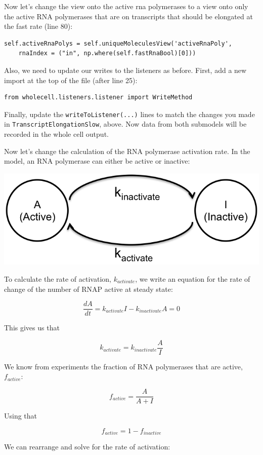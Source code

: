 \documentclass[12pt]{article}
\begin{document}
Now let's change the view onto the active rna polymerases to a view onto only the active RNA polymerases that are on transcripts that should be elongated at the fast rate (line 80):

\begin{lstlisting}
self.activeRnaPolys = self.uniqueMoleculesView('activeRnaPoly',
	rnaIndex = ("in", np.where(self.fastRnaBool)[0]))
\end{lstlisting}

Also, we need to update our writes to the listeners as before. First, add a new import at the top of the file (after line 25):
\begin{lstlisting}
from wholecell.listeners.listener import WriteMethod
\end{lstlisting}

Finally, update the \texttt{writeToListener(...)} lines to match the changes you made in \texttt{TranscriptElongationSlow}, above. Now data from both submodels will be recorded in the whole cell output.

Now let's change the calculation of the RNA polymerase activation rate. In the model, an RNA polymerase can either be active or inactive:

\includegraphics{img.png}


To calculate the rate of activation, $k_{activate}$, we write an equation for the rate of change of the number of RNAP active at steady state:

$$
\frac{dA}{dt}=k_{activate}I - k_{inactivate}A=0
$$

This gives us that

$$
k_{activate} = k_{inactivate}\frac{A}{I}
$$


We know from experiments the fraction of RNA polymerases that are active, $f_{active}$:

$$
f_{active}=\frac{A}{A+I}
$$

Using that 

$$
f_{active} = 1 - f_{inactive}
$$

We can rearrange and solve for the rate of activation:
\end{document}
